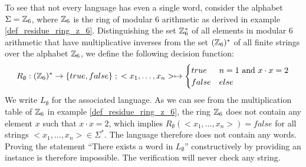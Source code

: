 \begin{example} To see that not every language has even a single word, consider the alphabet $\Sigma = \mathbb{Z}_6$, where $\mathbb{Z}_6$ is the ring of modular $6$ arithmetic as derived in example \ref{def_residue_ring_z_6}. Distinguishing the set $\mathbb{Z}_6^*$ of all elements in modular $6$ arithmetic that have multiplicative inverses from the set $(\mathbb{Z}_6)^*$ of all finite strings over the alphabet $\mathbb{Z}_6$, we define the following decision function: 
$$
R_{\emptyset} : (\mathbb{Z}_{6})^* \to \{true, false\}\;;\;
<x_1,\ldots,x_n> \mapsto
\begin{cases}
true & n=1 \text{ and } x\cdot x = 2\\
false & else
\end{cases}
$$
We write $L_\emptyset$ for the associated language. As we can see from the multiplication table of $\mathbb{Z}_6$ in example \ref{def_residue_ring_z_6}, the ring $\mathbb{Z}_6$ does not contain any element $x$ such that $x\cdot x =2$, which implies $R_{\emptyset}(<x_1,\ldots,x_n>)=false$ for all strings $<x_1,\ldots,x_n>\in \Sigma^*$. The language therefore does not contain any words. Proving the statement ``There exists a word in $L_\emptyset$'' constructively by providing an instance is therefore impossible. The verification will never check any string.
\end{example}
